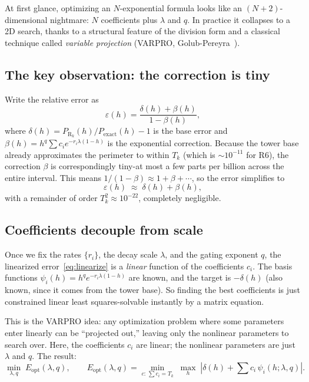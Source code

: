 \documentclass[12pt]{article}
\begin{document}
At first glance, optimizing an $N$-exponential formula looks like an $(N{+}2)$-dimensional nightmare: $N$ coefficients plus $\lambda$ and $q$. In practice it collapses to a 2D search, thanks to a structural feature of the division form and a classical technique called \emph{variable projection} (VARPRO, Golub-Pereyra~\cite{golub2003}).

\subsection{The key observation: the correction is tiny}

Write the relative error as
\begin{equation}
\varepsilon(h) = \frac{\delta(h)+\beta(h)}{1-\beta(h)},
\end{equation}
where $\delta(h) = P_{\text{R}_k}(h)/P_{\text{exact}}(h) - 1$ is the base error and $\beta(h) = h^q\sum c_i e^{-r_i\lambda(1-h)}$ is the exponential correction. Because the tower base already approximates the perimeter to within $T_k$ (which is ${\sim}10^{-11}$ for R6), the correction $\beta$ is correspondingly tiny-at most a few parts per billion across the entire interval. This means $1/(1-\beta) \approx 1 + \beta + \cdots$, so the error simplifies to
\begin{equation}\label{eq:linearize}
\varepsilon(h) \;\approx\; \delta(h) + \beta(h),
\end{equation}
with a remainder of order $T_k^2 \approx 10^{-22}$, completely negligible.

\subsection{Coefficients decouple from scale}

Once we fix the rates $\{r_i\}$, the decay scale $\lambda$, and the gating exponent $q$, the linearized error~\eqref{eq:linearize} is a \emph{linear} function of the coefficients $c_i$. The basis functions $\psi_i(h) = h^q e^{-r_i\lambda(1-h)}$ are known, and the target is $-\delta(h)$ (also known, since it comes from the tower base). So finding the best coefficients is just constrained linear least squares-solvable instantly by a matrix equation.

This is the VARPRO idea: any optimization problem where some parameters enter linearly can be ``projected out,'' leaving only the nonlinear parameters to search over. Here, the coefficients $c_i$ are linear; the nonlinear parameters are just $\lambda$ and $q$. The result:
\begin{equation}
\min_{\lambda,q}\; E_{\mathrm{opt}}(\lambda,q), \qquad E_{\mathrm{opt}}(\lambda,q) = \min_{c:\,\sum c_i = T_k}\;\max_h\;\left|\delta(h)+\textstyle\sum c_i\,\psi_i(h;\lambda,q)\right|.
\end{equation}
\end{document}
